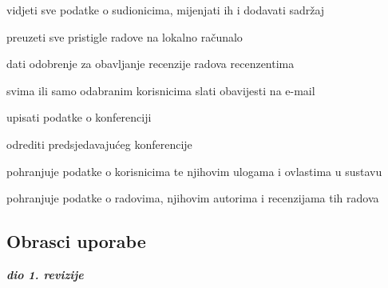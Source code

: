 \begin{packed_enum}
\begin{packed_enum}
					
				\end{packed_enum}
				
				\item  {}
				
				\begin{packed_enum}
				
					\item vidjeti sve podatke o sudionicima, mijenjati ih i dodavati sadržaj
					\item preuzeti sve pristigle radove na lokalno računalo
					\item dati odobrenje za obavljanje recenzije radova recenzentima
					\item svima ili samo odabranim korisnicima slati obavijesti na e-mail
				
				\end{packed_enum}
				
				\item  {}
				
				\begin{packed_enum}
				
					\item upisati podatke o konferenciji
					\item odrediti predsjedavajućeg konferencije
				\end{packed_enum}

				\item {}

				\begin{packed_enum}

					\item pohranjuje podatke o korisnicima te njihovim ulogama i ovlastima u sustavu
					\item pohranjuje podatke o radovima, njihovim autorima i recenzijama tih radova

				\end{packed_enum}
					
			\end{packed_enum}
			
			\eject 
			
			
				
			\subsection{Obrasci uporabe}
				
				\textbf{\textit{dio 1. revizije}}
				
